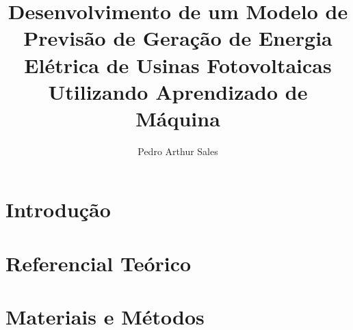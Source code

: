 \documentclass[tg]{ita}
\author{Pedro Arthur Sales}{Rebou\c{c}as}
\title{Desenvolvimento de um Modelo de Previs\~ao de Gera\c{c}\~ao de
       Energia El\'etrica de Usinas Fotovoltaicas Utilizando
       Aprendizado de M\'aquina}
\date{}{}{2026}
\begin{document}


\mainmatter

\chapter{Introdu\c{c}\~ao}
\label{cap:introducao}


\chapter{Referencial Te\'orico}
\label{cap:referencial_teorico}


\chapter{Materiais e M\'etodos}
\label{cap:materiais_metodos}


% 

% 

\renewcommand\bibname{\itareferencesnamebabel}


% 

% 
\end{document}
